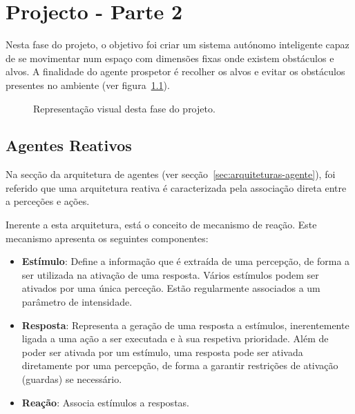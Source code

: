\chapter{Projecto - Parte 2}\label{ch:projeto-parte2}

Nesta fase do projeto, o objetivo foi criar um sistema autónomo inteligente capaz de se movimentar num espaço com dimensões fixas onde existem obstáculos e alvos.
A finalidade do agente prospetor é recolher os alvos e evitar os obstáculos presentes no ambiente (ver figura~\ref{fig:agente-prospetor}).

\begin{figure}[H]
    \label{fig:agente-prospetor}
    \begin{center}
    \end{center}
    \caption{Representação visual desta fase do projeto.}
\end{figure}

\section{Agentes Reativos}\label{sec:agentes-reativos}

Na secção da arquitetura de agentes (ver secção~\ref{sec:arquiteturas-agente}), foi referido que uma arquitetura reativa é caracterizada pela associação direta entre a perceções e ações.

Inerente a esta arquitetura, está o conceito de mecanismo de reação.
Este mecanismo apresenta os seguintes componentes:

\begin{itemize}
    \item \textbf{Estímulo}: Define a informação que é extraída de uma percepção, de forma a ser utilizada na ativação de uma resposta.
    Vários estímulos podem ser ativados por uma única perceção.
    Estão regularmente associados a um parâmetro de intensidade.
    \item \textbf{Resposta}: Representa a geração de uma resposta a estímulos, inerentemente ligada a uma ação a ser executada e à sua respetiva prioridade.
    Além de poder ser ativada por um estímulo, uma resposta pode ser ativada diretamente por uma percepção, de forma a garantir restrições de ativação (guardas) se necessário.
    \item \textbf{Reação}: Associa estímulos a respostas.
\end{itemize}

